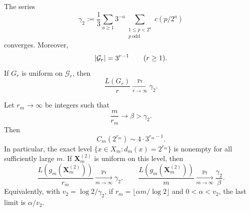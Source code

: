 \begin{theorem}
\label{thm:dyadic-exact-multiplier}
The series
\begin{equation}
 \gamma_2:=\frac13\sum_{a\ge1}3^{-a}
 \sum_{\substack{1\le p<2^a\\p\ \mathrm{odd}}}c(p/2^a)
 \label{eq:dyadic-cost-velocity}
\end{equation}
converges.  Moreover,
\[
 \lvert \mathcal G_r \rvert=3^{r-1}\qquad(r\ge1).
\]
If \(G_r\) is uniform on \(\mathcal G_r\), then
\begin{equation}
 \frac{L(G_r)}r\xrightarrow[r\to\infty]{\Pr}\gamma_2.
 \label{eq:dyadic-generator-bridge}
\end{equation}

Let \(r_m\to\infty\) be integers such that
\[
 \frac m{r_m}\longrightarrow\beta>\gamma_2.
\]
Then
\begin{equation}
 C_m(2^{r_m})\sim4\cdot3^{r_m-1}.
 \label{eq:dyadic-finite-window-count}
\end{equation}
In particular, the exact level \(\{x\in X_m:d_m(x)=2^{r_m}\}\) is nonempty
for all sufficiently large \(m\).  If \(\mathbf X_m^{(2)}\) is uniform on
this level, then
\begin{equation}
 \frac{L(g_m(\mathbf X_m^{(2)}))}{r_m}
 \xrightarrow[m\to\infty]{\Pr}\gamma_2,
 \qquad
 \frac{L(g_m(\mathbf X_m^{(2)}))}{m}
 \xrightarrow[m\to\infty]{\Pr}\frac{\gamma_2}{\beta}.
 \label{eq:dyadic-finite-window-bridge}
\end{equation}
Equivalently, with \(v_2=\log2/\gamma_2\), if
\(r_m=\lfloor\alpha m/\log2\rfloor\) and \(0<\alpha<v_2\), the last limit is
\(\alpha/v_2\).
\end{theorem}

